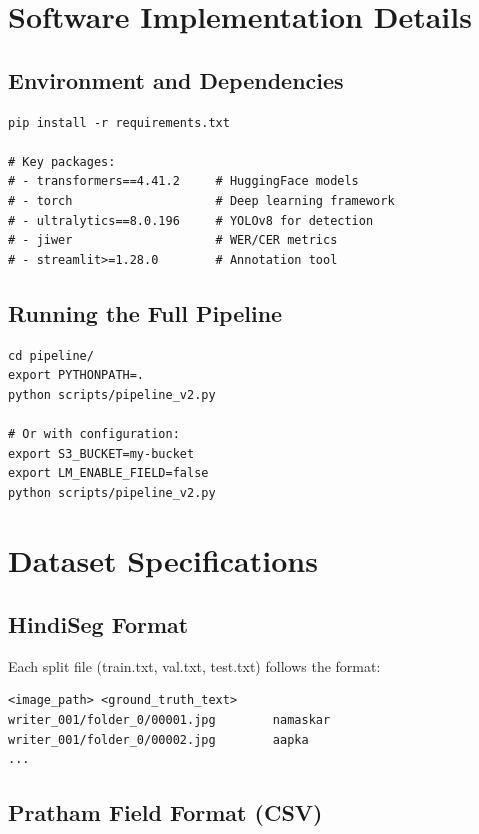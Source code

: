 \documentclass[14pt,a4paper]{article}
\begin{document}
\begin{appendices}
\newpage
\section{Software Implementation Details}

\subsection{Environment and Dependencies}

\begin{lstlisting}[caption=Installing dependencies]
pip install -r requirements.txt

# Key packages:
# - transformers==4.41.2     # HuggingFace models
# - torch                    # Deep learning framework
# - ultralytics==8.0.196     # YOLOv8 for detection
# - jiwer                    # WER/CER metrics
# - streamlit>=1.28.0        # Annotation tool
\end{lstlisting}

\subsection{Running the Full Pipeline}

\begin{lstlisting}[caption=Running v2 pipeline]
cd pipeline/
export PYTHONPATH=.
python scripts/pipeline_v2.py

# Or with configuration:
export S3_BUCKET=my-bucket
export LM_ENABLE_FIELD=false
python scripts/pipeline_v2.py
\end{lstlisting}

\section{Dataset Specifications}

\subsection{HindiSeg Format}

Each split file (train.txt, val.txt, test.txt) follows the format:
\begin{lstlisting}
<image_path> <ground_truth_text>
writer_001/folder_0/00001.jpg        namaskar
writer_001/folder_0/00002.jpg        aapka
...
\end{lstlisting}

\subsection{Pratham Field Format (CSV)}


\end{appendices}
\end{document}
